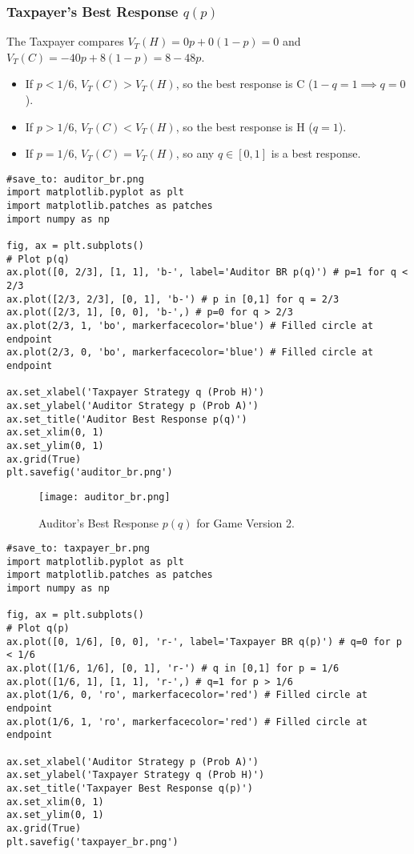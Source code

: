 \documentclass{article}
\begin{document}
\subsubsection{Taxpayer's Best Response $q(p)$}
The Taxpayer compares $V_T(H) = 0p + 0(1-p) = 0$ and $V_T(C) = -40p + 8(1-p) = 8-48p$.
\begin{itemize}
    \item If $p < 1/6$, $V_T(C) > V_T(H)$, so the best response is C ($1-q=1 \implies q=0$).
    \item If $p > 1/6$, $V_T(C) < V_T(H)$, so the best response is H ($q=1$).
    \item If $p = 1/6$, $V_T(C) = V_T(H)$, so any $q \in [0,1]$ is a best response.
\end{itemize}

\begin{verbatim}
#save_to: auditor_br.png
import matplotlib.pyplot as plt
import matplotlib.patches as patches
import numpy as np

fig, ax = plt.subplots()
# Plot p(q)
ax.plot([0, 2/3], [1, 1], 'b-', label='Auditor BR p(q)') # p=1 for q < 2/3
ax.plot([2/3, 2/3], [0, 1], 'b-') # p in [0,1] for q = 2/3
ax.plot([2/3, 1], [0, 0], 'b-',) # p=0 for q > 2/3
ax.plot(2/3, 1, 'bo', markerfacecolor='blue') # Filled circle at endpoint
ax.plot(2/3, 0, 'bo', markerfacecolor='blue') # Filled circle at endpoint

ax.set_xlabel('Taxpayer Strategy q (Prob H)')
ax.set_ylabel('Auditor Strategy p (Prob A)')
ax.set_title('Auditor Best Response p(q)')
ax.set_xlim(0, 1)
ax.set_ylim(0, 1)
ax.grid(True)
plt.savefig('auditor_br.png')
\end{verbatim}

\begin{figure}[H]
\centering
\texttt{[image: auditor\_br.png]}
\caption{Auditor's Best Response $p(q)$ for Game Version 2.}
\label{fig:auditor_br}
\end{figure}

\begin{verbatim}
#save_to: taxpayer_br.png
import matplotlib.pyplot as plt
import matplotlib.patches as patches
import numpy as np

fig, ax = plt.subplots()
# Plot q(p)
ax.plot([0, 1/6], [0, 0], 'r-', label='Taxpayer BR q(p)') # q=0 for p < 1/6
ax.plot([1/6, 1/6], [0, 1], 'r-') # q in [0,1] for p = 1/6
ax.plot([1/6, 1], [1, 1], 'r-',) # q=1 for p > 1/6
ax.plot(1/6, 0, 'ro', markerfacecolor='red') # Filled circle at endpoint
ax.plot(1/6, 1, 'ro', markerfacecolor='red') # Filled circle at endpoint

ax.set_xlabel('Auditor Strategy p (Prob A)')
ax.set_ylabel('Taxpayer Strategy q (Prob H)')
ax.set_title('Taxpayer Best Response q(p)')
ax.set_xlim(0, 1)
ax.set_ylim(0, 1)
ax.grid(True)
plt.savefig('taxpayer_br.png')
\end{verbatim}
\end{document}
